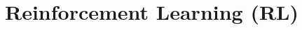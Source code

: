 \documentclass[11pt]{article}
\begin{document}




\section{Reinforcement Learning (RL)}
\end{document}
